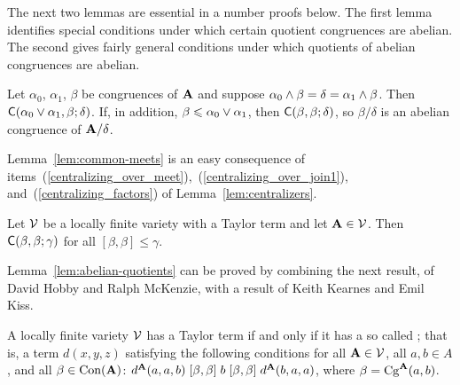 
The next two lemmas are essential in a number proofs below.
The first lemma identifies special conditions
under which certain quotient congruences are abelian.
The second gives fairly general conditions under which
quotients of abelian congruences are abelian.
\begin{lemma}
  \label{lem:common-meets}
  Let $\alpha_0$, $\alpha_1$, $\beta$ be congruences of $\mathbf{A}$ and suppose 
  $\alpha_0 \wedge \beta = \delta = \alpha_1 \wedge \beta$.
  Then $\mathsf{C}(\alpha_0 \vee \alpha_1,  \beta;  \delta)$.  If, in addition, 
  $\beta \leqslant \alpha_0 \vee \alpha_1$, then 
  $\mathsf{C}(\beta,  \beta;  \delta)$, so $\beta/\delta$ is an 
  abelian congruence of $\mathbf{A}/\delta$.
\end{lemma}
Lemma~\ref{lem:common-meets}
is an easy consequence
of items~(\ref{centralizing_over_meet}),~(\ref{centralizing_over_join1}),   
and~(\ref{centralizing_factors}) of Lemma~\ref{lem:centralizers}.
\begin{lemma}
  \label{lem:abelian-quotients}
  Let $\mathcal{V}$ be a locally finite variety with a Taylor term and let $\mathbf{A}\in \mathcal{V}$.
  Then $\mathsf{C}(\beta, \beta; \gamma)$ for all $[\beta, \beta] \leq \gamma$.
\end{lemma}
Lemma~\ref{lem:abelian-quotients} can be proved  by combining  
the next result, of David Hobby and Ralph McKenzie,
    with a result of
    Keith Kearnes and Emil Kiss.
\begin{lemma}
  \label{lem:HM-thm-7-12}
  A locally finite variety $\mathcal{V}$ has a Taylor term if and only if it has a
  so called ; that is, a term $d(x,y,z)$ satisfying
  the following conditions for all $\mathbf{A} \in \mathcal{V}$, all $a, b \in A$, and all
  $\beta \in \operatorname{Con} (\mathbf{A})$: 
  $d^{\mathbf{A}}(a,a,b) \mathrel{[\beta, \beta]} b \mathrel{[\beta, \beta]} d^{\mathbf{A}}(b,a,a)$,
  where $\beta = \operatorname{Cg}^{\mathbf{A}}(a,b)$.
\end{lemma}

